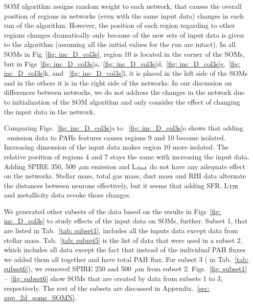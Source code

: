             SOM algorithm assigns random weight to each network, that causes the overall position of regions in networks (even with the same input data) changes in each run of the algorithm.
            However, the position of each region regarding to other regions changes dramatically only because of the new sets of input data is given to the algorithm (assuming all the initial values for the run are intact).
            In all SOMs in Fig~\ref{fig: inc_D_col3s}, region 10 is located in the corner of the SOMs, but in  Figs~\ref{fig: inc_D_col3s}a,~\ref{fig: inc_D_col3s}d,~\ref{fig: inc_D_col3s}g,~\ref{fig: inc_D_col3s}k, and ~\ref{fig: inc_D_col3s}l, it is placed in the left side of the SOMs and in the others it is in the right side of the networks.
            In our discussion on differences between networks, we do not address the changes in the network due to initialization of the SOM algorithm and only consider the effect of changing the input data in the network.
            
            Comparing Figs.~\ref{fig: inc_D_col3s}a to ~\ref{fig: inc_D_col3s}o shows that adding \halpha~emission data to PAHs features causes regions 9 and 10 become isolated. 
            Increasing dimension of the input data makes region 10 more isolated.
            The relative position of regions 4 and 7 stays the same with increasing the input data. 
            Adding SPIRE 350, 500~$\mu$m emission and L$_{\rm dust}$ do not have any adequate effect on the networks.
            Stellar mass, total gas mass, dust mass and RHI data alternate the distances between neurons effectively, but it seems that adding SFR, L$_{\rm TIR}$ and metallicity data revoke those changes.
            
            We generated other subsets of the data based on the results in Figs~\ref{fig: inc_D_col3s} to study effects of the input data on SOMs, further.
            Subset 1, that are listed in Tab.~\ref{tab: subset1}, includes all the inputs data except data from stellar mass.
            Tab.~\ref{tab: subset5} is the list of data that were used in a subset 2, which includes all data except the fact that instead of the individual PAH fluxes we added them all together and have total PAH flux. 
            For subset 3 ( in Tab.~\ref{tab: subset6}), we removed SPIRE 250 and 500~$\mu$m from subset 2.
            Figs.~\ref{fig: subset1} --~\ref{fig: subset6} show SOMs that are created by data from subsets 1 to 3, respectively.
            The rest of the subsets are discussed in Appendix.~\ref{sec: app_2d_soms_SOMN}.

